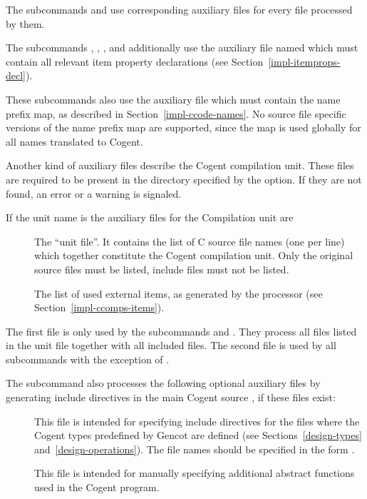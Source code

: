The subcommands  and  use corresponding auxiliary files for every file  processed by them.

The subcommands , , , and  additionally use the auxiliary file named
 which must contain all relevant item property declarations (see Section~\ref{impl-itemprops-decl}).

These subcommands also use the auxiliary file  which must contain the name prefix map, 
as described in Section~\ref{impl-ccode-names}. No source file specific versions of the name prefix map are supported,
since the map is used globally for all names translated to Cogent.

Another kind of auxiliary files describe the Cogent compilation unit. These files are required to be present 
in the directory specified by the  option. If they are not found, an error or a warning is signaled.

If the unit name is  the auxiliary files for the Compilation unit are
\begin{description}
\item[] The ``unit file''. It contains the list of C source file names
(one per line) which together constitute the Cogent compilation unit. Only the original source files  must 
be listed, include files  must not be listed.
\item[] The list of used external items, as generated by the processor 
(see Section~\ref{impl-ccomps-items}).
\end{description}

The first file is only used by the subcommands  and . They process all files listed in the unit file
together with all included files. The second file is used by all  subcommands with the exception of .

The subcommand  also processes the following optional auxiliary files by generating include directives in the 
main Cogent source , if these files exist:
\begin{description}
\item[] This file is intended for specifying include directives for the files
where the Cogent types predefined by Gencot are defined (see Sections~\ref{design-types} and~\ref{design-operations}).
The file names should be specified in the form . 
\item[] This file is intended for manually specifying additional abstract functions used 
in the Cogent program.
\end{description}


